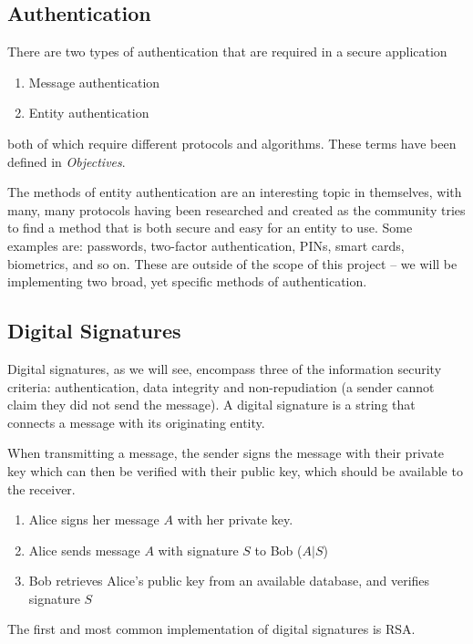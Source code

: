 \subsection{Authentication}

There are two types of authentication that are required in a secure application

\begin{enumerate}
	\item Message authentication
	\item Entity authentication
\end{enumerate}

both of which require different protocols and algorithms. These terms have been defined in \emph{Objectives}.

The methods of entity authentication are an interesting topic in themselves, with many, many protocols having been researched and created as the community tries to find a method that is both secure and easy for an entity to use. Some examples are: passwords, two-factor authentication, PINs, smart cards, biometrics, and so on. These are outside of the scope of this project -- we will be implementing two broad, yet specific methods of authentication.

\subsection{Digital Signatures}

Digital signatures, as we will see, encompass three of the information security criteria: authentication, data integrity and non-repudiation (a sender cannot claim they did not send the message). A digital signature is a string that connects a message with its originating entity.

When transmitting a message, the sender signs the message with their private key which can then be verified with their public key, which should be available to the receiver.

\begin{enumerate}
	\item Alice signs her message $A$ with her private key.
	\item Alice sends message $A$ with signature $S$ to Bob ($A|S$)
	\item Bob retrieves Alice's public key from an available database, and verifies signature $S$
\end{enumerate}

The first and most common implementation of digital signatures is RSA.

